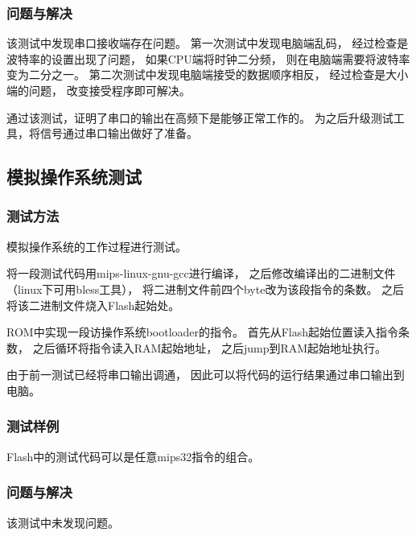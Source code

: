         \subsubsection{问题与解决}
            该测试中发现串口接收端存在问题。%
            第一次测试中发现电脑端乱码，%
            经过检查是波特率的设置出现了问题，%
            如果CPU端将时钟二分频，%
            则在电脑端需要将波特率变为二分之一。%
            第二次测试中发现电脑端接受的数据顺序相反，%
            经过检查是大小端的问题，%
            改变接受程序即可解决。

            通过该测试，证明了串口的输出在高频下是能够正常工作的。%
            为之后升级测试工具，将信号通过串口输出做好了准备。

    \subsection{模拟操作系统测试}
        \subsubsection{测试方法}
            模拟操作系统的工作过程进行测试。

            将一段测试代码用mips-linux-gnu-gcc进行编译，%
            之后修改编译出的二进制文件%
            （linux下可用bless工具），%
            将二进制文件前四个byte改为该段指令的条数。%
            之后将该二进制文件烧入Flash起始处。
            
            ROM中实现一段访操作系统bootloader的指令。%
            首先从Flash起始位置读入指令条数，%
            之后循环将指令读入RAM起始地址，%
            之后jump到RAM起始地址执行。

            由于前一测试已经将串口输出调通，%
            因此可以将代码的运行结果通过串口输出到电脑。

        \subsubsection{测试样例}
            Flash中的测试代码可以是任意mips32指令的组合。

        \subsubsection{问题与解决}
            该测试中未发现问题。%
            